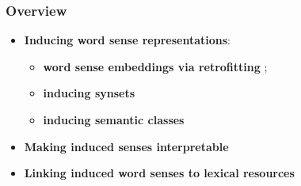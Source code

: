 \begin{frame}
  \frametitle{Overview}

  \begin{itemize}
		\item \alert{\textbf{Inducing word sense representations}}:
		\begin{itemize}
		\item \textbf{word sense embeddings via retrofitting} \cite{pelevina-EtAl:2016:RepL4NLP,remus:2018};
		\item \textbf{inducing synsets}~\cite{ustalov-panchenko-biemann:2017:Long,ustalov2017fighting,madoc43362}
		\item \textbf{inducing semantic classes} \cite{panchenko:2018:SemanticClasses} 
				
		\end{itemize}

	
	\pause 
	\vspace{1em}
	\item \alert{\textbf{Making induced senses interpretable}} \cite{panchenko-EtAl:2017:EMNLP2017Demos,panchenko-EtAl:2017:EACLlong}
	
	\pause
	\vspace{1em}
	\item \alert{\textbf{Linking induced word senses to lexical resources}}~\cite{panchenko2016best,faralli2016linked,panchenko-EtAl:2017:SENSE2017,biemann2018framework}	
			
\end{itemize}
	
\end{frame}


